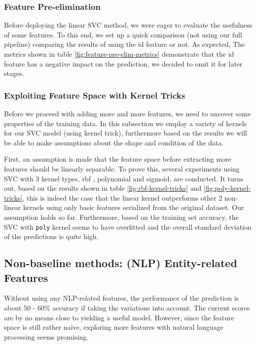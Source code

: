 \subsubsection{Feature Pre-elimination}

Before deploying the linear SVC method, we were eager to evaluate the usefulness of some features.
To this end, we set up a quick comparison (not using our full pipeline) comparing the results of using the id feature or not.
As expected, The metrics shown in table \autoref{fig:feature-pre-elim-metrics} demonstrate that the id feature has a negative impact on the prediction, we decided to omit it for later stages.

\subsubsection{Exploiting Feature Space with Kernel Tricks}

Before we proceed with adding more and more features, we need to uncover some properties of the training data.
In this subsection we employ a variety of kernels for our SVC model (using kernel trick), furthermore based on the results we will be able to make assumptions about the shape and condition of the data.


First, an assumption is made that the feature space before extracting more features should be linearly separable.
To prove this, several experiments using SVC with 3 kernel types, rbf \cite{x1}, polynomial and sigmoid, are conducted.
It turns out, based on the results shown in table \autoref{fig:rbf-kernel-tricks} and \autoref{fig:poly-kernel-tricks}, this is indeed the case that the linear kernel outperforms other 2 non-linear kernels using only basic features serialized from the original dataset.
Our assumption holds so far.
Furthermore, based on the training set accuracy, the SVC with \verb|poly| kernel seems to have overfitted and the overall standard deviation of the predictions is quite high.

\subsection{Non-baseline methods: (NLP) Entity-related Features}

Without using any NLP-related features, the performance of the prediction is about 50 - 60\% accuracy if taking the variations into account. The current scores are by no means close to yielding a useful model. However, since the feature space is still rather naïve, exploring more features with natural language processing seems promising.

